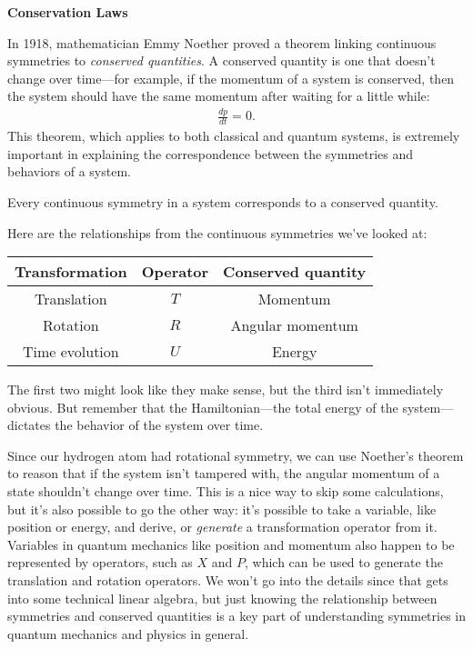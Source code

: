 \noindent
\textbf{Conservation Laws}

In 1918, mathematician Emmy Noether proved a theorem linking continuous symmetries to \emph{conserved quantities}. A conserved quantity is one that doesn't change over time---for example, if the momentum of a system is conserved, then the system should have the same momentum after waiting for a little while:
\begin{align*}
    \frac{dp}{dt} = 0.
\end{align*}
This theorem, which applies to both classical and quantum systems, is extremely important in explaining the correspondence between the symmetries and behaviors of a system.
\begin{theorem}
Every continuous symmetry in a system corresponds to a conserved quantity.
\end{theorem}
Here are the relationships from the continuous symmetries we've looked at:
\begin{center}
    \begin{tabular}{|c|c|c|}
    \hline
    Transformation & Operator & Conserved quantity \\
    \hline
    Translation & $T$ & Momentum \\
    Rotation & $R$ & Angular momentum \\
    Time evolution & $U$ & Energy \\
    \hline
    \end{tabular}
\end{center}
The first two might look like they make sense, but the third isn't immediately obvious. But remember that the Hamiltonian---the total energy of the system---dictates the behavior of the system over time.

Since our hydrogen atom had rotational symmetry, we can use Noether's theorem to reason that if the system isn't tampered with, the angular momentum of a state shouldn't change over time. This is a nice way to skip some calculations, but it's also possible to go the other way: it's possible to take a variable, like position or energy, and derive, or \emph{generate} a transformation operator from it. Variables in quantum mechanics like position and momentum also happen to be represented by operators, such as $X$ and $P$, which can be used to generate the translation and rotation operators. We won't go into the details since that gets into some technical linear algebra, but just knowing the relationship between symmetries and conserved quantities is a key part of understanding symmetries in quantum mechanics and physics in general.

